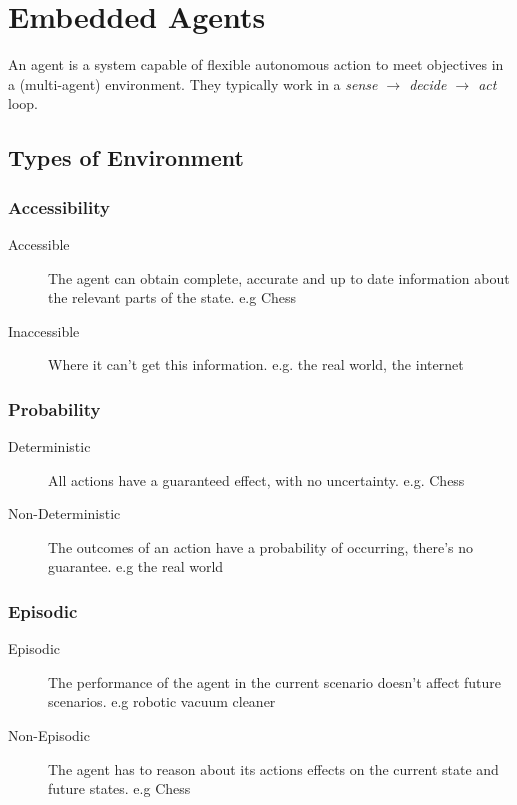 \section{Embedded Agents}
An agent is a system capable of flexible autonomous action to meet objectives in a (multi-agent) environment. They typically work in  a \emph{sense $\rightarrow$ decide $\rightarrow$ act} loop. 

\subsection{Types of Environment}

\subsubsection{Accessibility}
\begin{description}
    \item [Accessible] The agent can obtain complete, accurate and up to date information about the relevant parts of the state. e.g Chess
    \item[Inaccessible] Where it can't get this information. e.g. the real world, the internet
\end{description}

\subsubsection{Probability}
\begin{description}
    \item [Deterministic] All actions have a guaranteed effect, with no uncertainty. e.g. Chess
    \item[Non-Deterministic] The outcomes of an action have a probability of occurring, there's no guarantee. e.g the real world
\end{description}

\subsubsection{Episodic}
\begin{description}
    \item [Episodic] The performance of the agent in the current scenario doesn't affect future scenarios. e.g robotic vacuum cleaner
    \item[Non-Episodic] The agent has to reason about its actions effects on the current state and future states. e.g Chess
\end{description}

